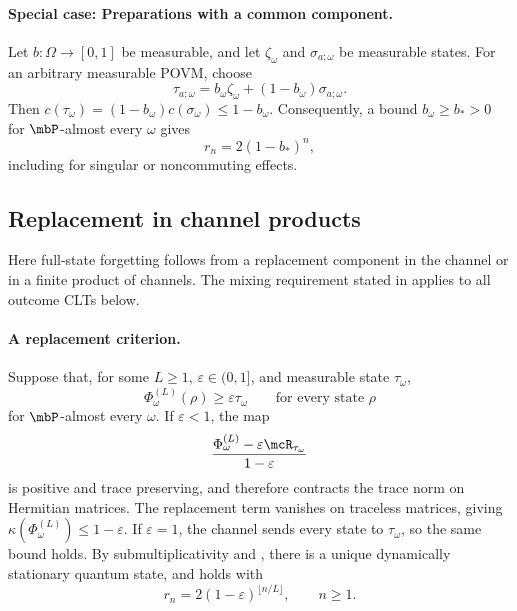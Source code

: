 \documentclass[a4paper]{article}
\numberwithin{equation}{section}   %
\theoremstyle{plain}   %
\theoremstyle{plain}   %
\theoremstyle{examplestyle}
\DeclareMathOperator{\pr}{\mbP}           %
\begin{document}
    \paragraph{Special case: Preparations with a common component.}
    \label{par:preparations-common-component}
        Let $b:\Omega\to[0,1]$ be measurable, and let $\zeta_\omega$ and $\sigma_{a;\omega}$ be measurable states.
        For an arbitrary measurable POVM, choose
        \[
             \tau_{a;\omega}
             =b_\omega\zeta_\omega+(1-b_\omega)\sigma_{a;\omega}.
        \]
        Then $c(\tau_\omega)=(1-b_\omega)c(\sigma_\omega)\le1-b_\omega$.
        Consequently, a bound $b_\omega\ge b_*>0$ for $\pr$-almost every $\omega$ gives
        \[
            r_n=2(1-b_*)^n,
        \]
        including for singular or noncommuting effects.

    
\subsection{Replacement in channel products}
\label{subsec:unified:replacement}


    Here full-state forgetting follows from a replacement component in the channel or in a finite product of channels.
    The mixing requirement stated in  applies to all outcome CLTs below.

    \paragraph{A replacement criterion.}
        Suppose that, for some $L\ge1$, $\varepsilon\in(0,1]$, and measurable state $\tau_\omega$,
        \begin{equation}
        \label{eq:unified:replacement}
             \Phi_\omega^{(L)}(\rho)\ge\varepsilon\tau_\omega
             \qquad\text{for every state }\rho
        \end{equation}
        for $\pr$-almost every $\omega$.
        If $\varepsilon<1$, the map
        \[
         \frac{\Phi_\omega^{(L)}
               -\varepsilon\mcR_{\tau_\omega}}{1-\varepsilon}
        \]
        is positive and trace preserving, and therefore contracts the trace norm on Hermitian matrices.
        The replacement term vanishes on traceless matrices, giving $\kappa(\Phi_\omega^{(L)})\le1-\varepsilon$.
        If $\varepsilon=1$, the channel sends every state to $\tau_\omega$, so the same bound holds.
        By submultiplicativity and , there is a unique dynamically stationary quantum state, and  holds with
        \[
            r_n=2(1-\varepsilon)^{\lfloor n/L\rfloor},
             \qquad n\ge1.
        \]
\end{document}
